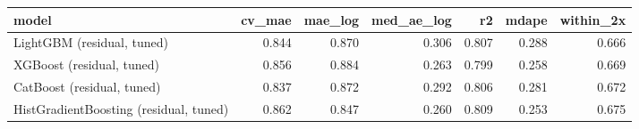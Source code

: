 \begin{tabular}{lrrrrrr}
\toprule
model & cv_mae & mae_log & med_ae_log & r2 & mdape & within_2x \\
\midrule
LightGBM (residual, tuned) & 0.844 & 0.870 & 0.306 & 0.807 & 0.288 & 0.666 \\
XGBoost (residual, tuned) & 0.856 & 0.884 & 0.263 & 0.799 & 0.258 & 0.669 \\
CatBoost (residual, tuned) & 0.837 & 0.872 & 0.292 & 0.806 & 0.281 & 0.672 \\
HistGradientBoosting (residual, tuned) & 0.862 & 0.847 & 0.260 & 0.809 & 0.253 & 0.675 \\
\bottomrule
\end{tabular}
